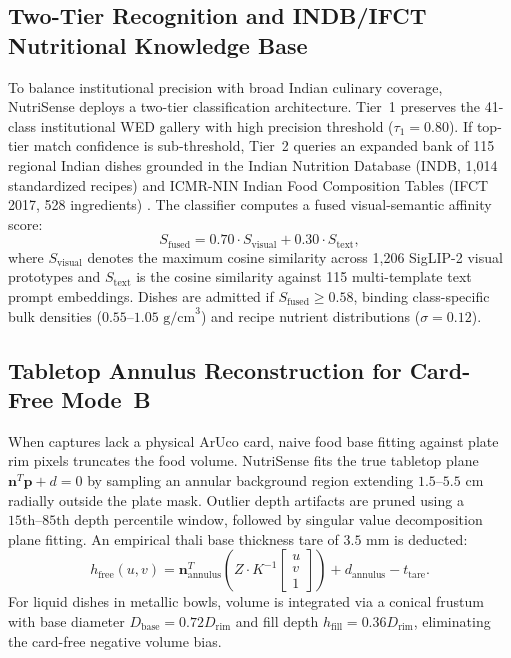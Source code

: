 \documentclass[conference]{IEEEtran}
\begin{document}
\subsection{Two-Tier Recognition and INDB/IFCT Nutritional Knowledge Base}
To balance institutional precision with broad Indian culinary coverage, NutriSense deploys a two-tier classification architecture. Tier~1 preserves the 41-class institutional WED gallery with high precision threshold ($\tau_1 = 0.80$). If top-tier match confidence is sub-threshold, Tier~2 queries an expanded bank of 115 regional Indian dishes grounded in the Indian Nutrition Database (INDB, 1,014 standardized recipes) \cite{indb2021} and ICMR-NIN Indian Food Composition Tables (IFCT 2017, 528 ingredients) \cite{ifct2017}. The classifier computes a fused visual-semantic affinity score:
\begin{equation}
S_{\mathrm{fused}} = 0.70 \cdot S_{\mathrm{visual}} + 0.30 \cdot S_{\mathrm{text}},
\end{equation}
where $S_{\mathrm{visual}}$ denotes the maximum cosine similarity across 1,206 SigLIP-2 visual prototypes and $S_{\mathrm{text}}$ is the cosine similarity against 115 multi-template text prompt embeddings. Dishes are admitted if $S_{\mathrm{fused}} \ge 0.58$, binding class-specific bulk densities ($0.55\text{--}1.05\text{ g/cm}^3$) and recipe nutrient distributions ($\sigma = 0.12$).

\subsection{Tabletop Annulus Reconstruction for Card-Free Mode~B}
When captures lack a physical ArUco card, naive food base fitting against plate rim pixels truncates the food volume. NutriSense fits the true tabletop plane $\mathbf{n}^T \mathbf{p} + d = 0$ by sampling an annular background region extending $1.5\text{--}5.5\text{ cm}$ radially outside the plate mask. Outlier depth artifacts are pruned using a $15\text{th--}85\text{th}$ depth percentile window, followed by singular value decomposition plane fitting. An empirical thali base thickness tare of $3.5\text{ mm}$ is deducted:
\begin{equation}
h_{\mathrm{free}}(u, v) = \mathbf{n}_{\mathrm{annulus}}^T \left( Z \cdot K^{-1} \begin{bmatrix} u \\ v \\ 1 \end{bmatrix} \right) + d_{\mathrm{annulus}} - t_{\mathrm{tare}}.
\end{equation}
For liquid dishes in metallic bowls, volume is integrated via a conical frustum with base diameter $D_{\mathrm{base}} = 0.72 D_{\mathrm{rim}}$ and fill depth $h_{\mathrm{fill}} = 0.36 D_{\mathrm{rim}}$, eliminating the card-free negative volume bias.
\end{document}
